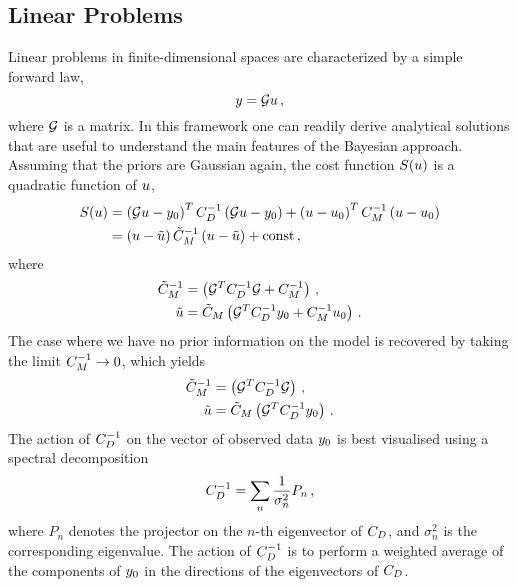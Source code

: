 \subsection{Linear Problems}
\label{sec:LinProbs}

Linear problems in finite-dimensional spaces are characterized by a simple forward law, 
\begin{equation}
  \label{eq:MatrixG}
  y = \mathcal{G} u\, ,
\end{equation}
where $\mathcal{G}$ is a matrix. In this framework one can readily  derive
analytical solutions that are useful to understand the main features of the
Bayesian approach. Assuming that the priors are Gaussian again, the cost
function $S(u)$ is a quadratic function of $u$,
\begin{align}
  \label{eq:CostLinGauss}
  S(u) &= 
  \left(\mathcal{G} u - y_0 \right)^T C_{D}^{-1} 
  \left(\mathcal{G} u - y_0 \right) + 
  \left( u - u_0 \right)^T C_M^{-1} \left(u - u_0 \right) \\
  &= 
  \left(u - \tilde{u}\right) \tilde{C}_M^{-1}
  \left(u - \tilde{u}\right) + \mathrm{const}\, ,
\end{align} 
where
\begin{align}
  \label{eq:PostParamsCov}
  \tilde{C}_M^{-1} &= 
  \left(
    \mathcal{G}^T C_{D}^{-1} \mathcal{G} + C_M^{-1}
  \right)\, , \\
  \label{eq:PostParamsMean}
  \tilde{u} &=
  \tilde{C}_M  \left(
    \mathcal{G}^T C_{D}^{-1} y_0 + C_M^{-1} u_0
  \right)\, .
\end{align}
The case where we have no prior information on the model is recovered by taking
the limit $C_M^{-1} \to 0$, which yields
\begin{align}
  \label{eq:NoPriorLinModel}
  \tilde{C}_M^{-1} &= 
  \left(
    \mathcal{G}^T C_{D}^{-1} \mathcal{G}
  \right)\, , \\
  \tilde{u} &=
  \tilde{C}_M  \left(
    \mathcal{G}^T C_{D}^{-1} y_0 
  \right)\, . \label{eq:NoPriorLinModelCov}
\end{align}
The action of $C_{D}^{-1}$ on the vector of observed data $y_0$
is best visualised using a spectral decomposition
\begin{equation}
  \label{eq:CDSpecDec}
  C_{D}^{-1} = \sum_n \frac{1}{\sigma_n^2} P_n\, ,
\end{equation}
where $P_n$ denotes the projector on the $n$-th eigenvector of $C_{D}$, and
$\sigma_n^2$ is the corresponding eigenvalue. The action of $C_{D}^{-1}$ is to
perform a weighted average of the components of $y_0$ in the directions of the
eigenvectors of $C_{D}$.

